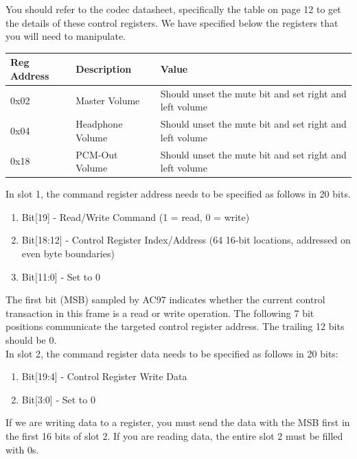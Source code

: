 \documentclass[11pt]{article}
\begin{document}
You should refer to the codec datasheet, specifically the table on page 12 to get the details of these control registers. We have specified below the registers that you will need to manipulate. \\

\begin{center}
	\begin{tabular}{ | l | l | p{8cm} |}
		\hline
		Reg Address & Description & Value \\ \hline
		0x02 & Master Volume & Should unset the mute bit and set right and left volume \\ \hline
		0x04 & Headphone Volume & Should unset the mute bit and set right and left volume \\ \hline
		0x18 & PCM-Out Volume & Should unset the mute bit and set right and left volume \\ \hline
	\end{tabular}
\end{center}

In slot 1, the command register address needs to be specified as follows in 20 bits.
\begin{enumerate}
	\item Bit[19] - Read/Write Command (1 = read, 0 = write)
	\item Bit[18:12] - Control Register Index/Address (64 16-bit locations, addressed on even byte boundaries)
	\item Bit[11:0] - Set to 0
\end{enumerate}

The first bit (MSB) sampled by AC97 indicates whether the current control transaction in this frame is a read or write operation. The following 7 bit positions communicate the targeted control register address. The trailing 12 bits should be 0. \\

In slot 2, the command register data needs to be specified as follows in 20 bits:

\begin{enumerate}
	\item Bit[19:4] - Control Register Write Data
	\item Bit[3:0] - Set to 0
\end{enumerate}

If we are writing data to a register, you must send the data with the MSB first in the first 16 bits of slot 2. If you are reading data, the entire slot 2 must be filled with 0s. \\
\end{document}
